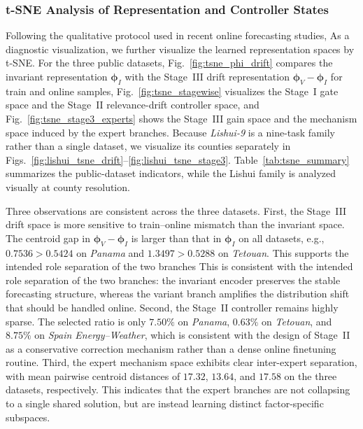 ﻿\documentclass[journal]{IEEEtran}
\DeclareRobustCommand{\oldtext}[1]{{\color{revisionred}#1}}
\DeclareRobustCommand{\newtext}[1]{{\color{revisionblue}#1}}
\DeclareRobustCommand{\why}[1]{{\color{revisionblue}{\footnotesize (#1)}}}
\DeclareRobustCommand{\rw}[3]{\oldtext{#1} \newtext{#2}\why{#3}}
\begin{document}
\subsubsection{t-SNE Analysis of Representation and Controller States}
\rw{Following the qualitative protocol used in recent online forecasting studies,}{As a diagnostic visualization,}{删除未给引用支撑的 recent studies 表述。} we further visualize the learned representation spaces by t-SNE. For the three public datasets, Fig.~\ref{fig:tsne_phi_drift} compares the invariant representation $\boldsymbol{\phi}_{I}$ with the Stage~III drift representation $\boldsymbol{\phi}_{V}-\boldsymbol{\phi}_{I}$ for train and online samples, Fig.~\ref{fig:tsne_stagewise} visualizes the Stage~I gate space and the Stage~II relevance-drift controller space, and Fig.~\ref{fig:tsne_stage3_experts} shows the Stage~III gain space and the mechanism space induced by the expert branches. Because \textit{Lishui-9} is a nine-task family rather than a single dataset, we visualize its counties separately in Figs.~\ref{fig:lishui_tsne_drift}--\ref{fig:lishui_tsne_stage3}. Table~\ref{tab:tsne_summary} summarizes the public-dataset indicators, while the Lishui family is analyzed visually at county resolution.

Three observations are consistent across the three datasets. First, the Stage~III drift space is more sensitive to train--online mismatch than the invariant space. The centroid gap in $\boldsymbol{\phi}_{V}-\boldsymbol{\phi}_{I}$ is larger than that in $\boldsymbol{\phi}_{I}$ on all datasets, e.g., $0.7536>0.5424$ on \textit{Panama} and $1.3497>0.5288$ on \textit{Tetouan}. \rw{This supports the intended role separation of the two branches}{This is consistent with the intended role separation of the two branches}{t-SNE 只能支持一致性观察，不是机制证明。}: the invariant encoder preserves the stable forecasting structure, whereas the variant branch amplifies the distribution shift that should be handled online. Second, the Stage~II controller remains highly sparse. The selected ratio is only $7.50\%$ on \textit{Panama}, $0.63\%$ on \textit{Tetouan}, and $8.75\%$ on \textit{Spain Energy--Weather}, which is consistent with the design of Stage~II as a conservative correction mechanism rather than a dense online finetuning routine. Third, the expert mechanism space exhibits clear inter-expert separation, with mean pairwise centroid distances of $17.32$, $13.64$, and $17.58$ on the three datasets, respectively. This indicates that the expert branches are not collapsing to a single shared solution, but are instead learning distinct factor-specific subspaces.
\end{document}
